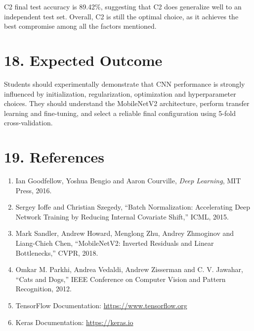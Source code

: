 \documentclass[10pt]{article}
\begin{document}
C2 final test accuracy is 89.42\%, suggesting that C2 does generalize well
to an independent test set. Overall, C2 is still the optimal choice, as it achieves
the best compromise among all the factors mentioned.

\section*{18. Expected Outcome}

Students should experimentally demonstrate that CNN performance is
strongly influenced by initialization, regularization, optimization and
hyperparameter choices. They should understand the MobileNetV2 architecture,
perform transfer learning and fine-tuning, and select a reliable final
configuration using 5-fold cross-validation.

\section*{19. References}

\begin{enumerate}
\item Ian Goodfellow, Yoshua Bengio and Aaron Courville,
\emph{Deep Learning}, MIT Press, 2016.

\item Sergey Ioffe and Christian Szegedy,
``Batch Normalization: Accelerating Deep Network Training by Reducing
Internal Covariate Shift,'' ICML, 2015.

\item Mark Sandler, Andrew Howard, Menglong Zhu, Andrey Zhmoginov and
Liang-Chieh Chen, ``MobileNetV2: Inverted Residuals and Linear
Bottlenecks,'' CVPR, 2018.

\item Omkar M. Parkhi, Andrea Vedaldi, Andrew Zisserman and C. V. Jawahar,
``Cats and Dogs,'' IEEE Conference on Computer Vision and Pattern
Recognition, 2012.

\item TensorFlow Documentation:
\url{https://www.tensorflow.org}

\item Keras Documentation:
\url{https://keras.io}
\end{enumerate}
\end{document}
